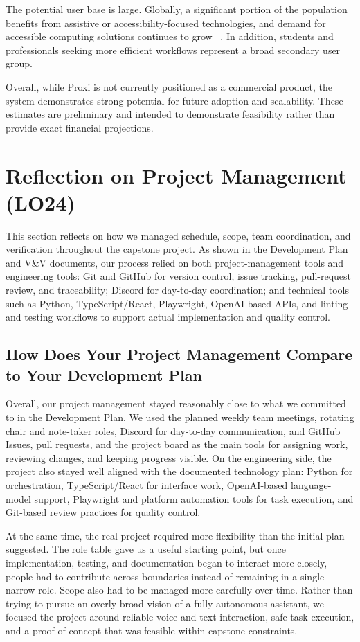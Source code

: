 \documentclass{article}
\begin{document}
The potential user base is large. Globally, a significant portion of the
population benefits from assistive or accessibility-focused technologies,
and demand for accessible computing solutions continues to grow
~\citep{accessibility}. In addition, students and professionals seeking
more efficient workflows represent a broad secondary user group.

Overall, while Proxi is not currently positioned as a commercial product,
the system demonstrates strong potential for future adoption and
scalability. These estimates are preliminary and intended to demonstrate
feasibility rather than provide exact financial projections.

\section{Reflection on Project Management (LO24)}

This section reflects on how we managed schedule, scope, team
coordination, and verification throughout the capstone project. As
shown in the Development Plan and V\&V documents, our process relied on
both project-management tools and engineering tools: Git and GitHub for
version control, issue tracking, pull-request review, and traceability;
Discord for day-to-day coordination; and technical tools such as
Python, TypeScript/React, Playwright, OpenAI-based APIs, and linting
and testing workflows to support actual implementation and quality
control.

\subsection{How Does Your Project Management Compare to Your Development Plan}

Overall, our project management stayed reasonably close to what we
committed to in the Development Plan. We used the planned weekly team
meetings, rotating chair and note-taker roles, Discord for day-to-day
communication, and GitHub Issues, pull requests, and the project board
as the main tools for assigning work, reviewing changes, and keeping
progress visible. On the engineering side, the project also stayed well
aligned with the documented technology plan: Python for orchestration,
TypeScript/React for interface work, OpenAI-based language-model
support, Playwright and platform automation tools for task execution,
and Git-based review practices for quality control.

At the same time, the real project required more flexibility than the
initial plan suggested. The role table gave us a useful starting point,
but once implementation, testing, and documentation began to interact
more closely, people had to contribute across boundaries instead of
remaining in a single narrow role. Scope also had to be managed more
carefully over time. Rather than trying to pursue an overly broad vision
of a fully autonomous assistant, we focused the project around reliable
voice and text interaction, safe task execution, and a proof of concept
that was feasible within capstone constraints.
\end{document}
